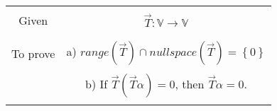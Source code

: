 \begin{table}[h!]
\begin{center}
\begin{tabular}{|c|c|}
\hline
& \\
Given & $\vec{T}:\mathbb{V} \rightarrow \mathbb{V}$\\
&\\
\hline
& \\
To prove & a) $ range(\vec{T}) \cap null space(\vec{T}) = \left\lbrace 0 \right\rbrace$\\
& \\
& b) If $\vec{T}(\vec{T}\alpha) = 0$, then $\vec{T}\alpha = 0$.\\
& \\
\hline
\end{tabular}
\end{center}
\end{table}
